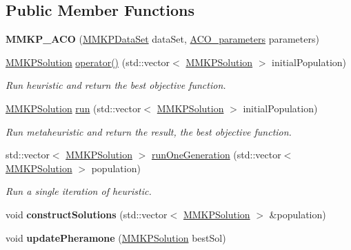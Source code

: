 \subsection*{Public Member Functions}
\begin{DoxyCompactItemize}
\item 
\hypertarget{class_m_m_k_p___a_c_o_af3316df74f8ea3334dc97cde7791cbd2}{{\bfseries M\+M\+K\+P\+\_\+\+A\+C\+O} (\hyperlink{class_m_m_k_p_data_set}{M\+M\+K\+P\+Data\+Set} data\+Set, \hyperlink{class_a_c_o__parameters}{A\+C\+O\+\_\+parameters} parameters)}\label{class_m_m_k_p___a_c_o_af3316df74f8ea3334dc97cde7791cbd2}

\item 
\hyperlink{class_m_m_k_p_solution}{M\+M\+K\+P\+Solution} \hyperlink{class_m_m_k_p___a_c_o_a0d8af29cc503c3f97788af97611d64ae}{operator()} (std\+::vector$<$ \hyperlink{class_m_m_k_p_solution}{M\+M\+K\+P\+Solution} $>$ initial\+Population)
\begin{DoxyCompactList}\small\item\em Run heuristic and return the best objective function. \end{DoxyCompactList}\item 
\hypertarget{class_m_m_k_p___a_c_o_ab2625fe1df6ac86a20f50e6bb684019a}{\hyperlink{class_m_m_k_p_solution}{M\+M\+K\+P\+Solution} \hyperlink{class_m_m_k_p___a_c_o_ab2625fe1df6ac86a20f50e6bb684019a}{run} (std\+::vector$<$ \hyperlink{class_m_m_k_p_solution}{M\+M\+K\+P\+Solution} $>$ initial\+Population)}\label{class_m_m_k_p___a_c_o_ab2625fe1df6ac86a20f50e6bb684019a}

\begin{DoxyCompactList}\small\item\em Run metaheuristic and return the result, the best objective function. \end{DoxyCompactList}\item 
\hypertarget{class_m_m_k_p___a_c_o_a704424aad2dcfd78c1643ef808da0d3d}{std\+::vector$<$ \hyperlink{class_m_m_k_p_solution}{M\+M\+K\+P\+Solution} $>$ \hyperlink{class_m_m_k_p___a_c_o_a704424aad2dcfd78c1643ef808da0d3d}{run\+One\+Generation} (std\+::vector$<$ \hyperlink{class_m_m_k_p_solution}{M\+M\+K\+P\+Solution} $>$ population)}\label{class_m_m_k_p___a_c_o_a704424aad2dcfd78c1643ef808da0d3d}

\begin{DoxyCompactList}\small\item\em Run a single iteration of heuristic. \end{DoxyCompactList}\item 
\hypertarget{class_m_m_k_p___a_c_o_a3ef620f8c9d2eee75bfbce33976398ee}{void {\bfseries construct\+Solutions} (std\+::vector$<$ \hyperlink{class_m_m_k_p_solution}{M\+M\+K\+P\+Solution} $>$ \&population)}\label{class_m_m_k_p___a_c_o_a3ef620f8c9d2eee75bfbce33976398ee}

\item 
\hypertarget{class_m_m_k_p___a_c_o_af91feee9d55d2e7e3806a595227b3e54}{void {\bfseries update\+Pheramone} (\hyperlink{class_m_m_k_p_solution}{M\+M\+K\+P\+Solution} best\+Sol)}\label{class_m_m_k_p___a_c_o_af91feee9d55d2e7e3806a595227b3e54}

\end{DoxyCompactItemize}
